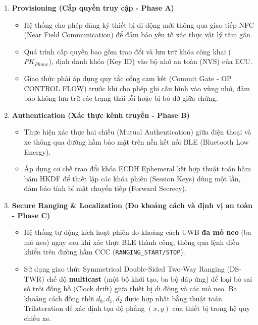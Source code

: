 \begin{enumerate}
    \item \textbf{Provisioning (Cấp quyền truy cập - Phase A)}
    \begin{itemize}
        \item Hệ thống cho phép đăng ký thiết bị di động mới thông qua giao tiếp NFC (Near Field Communication) để đảm bảo yếu tố xác thực vật lý tầm gần.
        \item Quá trình cấp quyền bao gồm trao đổi và lưu trữ khóa công khai ($PK_{Phone}$), định danh khóa (Key ID) vào bộ nhớ an toàn (NVS) của ECU.
        \item Giao thức phải áp dụng quy tắc cổng cam kết (Commit Gate - OP CONTROL FLOW) trước khi cho phép ghi cấu hình vào vùng nhớ, đảm bảo không lưu trữ các trạng thái lỗi hoặc bị bỏ dở giữa chừng.
    \end{itemize}

    \item \textbf{Authentication (Xác thực kênh truyền - Phase B)}
    \begin{itemize}
        \item Thực hiện xác thực hai chiều (Mutual Authentication) giữa điện thoại và xe thông qua đường hầm bảo mật trên nền kết nối BLE (Bluetooth Low Energy).
        \item Áp dụng cơ chế trao đổi khóa ECDH Ephemeral kết hợp thuật toán hàm băm HKDF để thiết lập các khóa phiên (Session Keys) dùng một lần, đảm bảo tính bí mật chuyển tiếp (Forward Secrecy).
    \end{itemize}

    \item \textbf{Secure Ranging \& Localization (Đo khoảng cách và định vị an toàn - Phase C)}
    \begin{itemize}
        \item Hệ thống tự động kích hoạt phiên đo khoảng cách UWB \textbf{đa mỏ neo} (ba mỏ neo) ngay sau khi xác thực BLE thành công, thông qua lệnh điều khiển trên đường hầm CCC (\texttt{RANGING\_START/STOP}).
        \item Sử dụng giao thức Symmetrical Double-Sided Two-Way Ranging (DS-TWR) chế độ \textbf{multicast} (một bộ khởi tạo, ba bộ đáp ứng) để loại bỏ sai số trôi đồng hồ (Clock drift) giữa thiết bị di động và các mỏ neo. Ba khoảng cách đồng thời $d_0, d_1, d_2$ được hợp nhất bằng thuật toán Trilateration để xác định tọa độ phẳng $(x, y)$ của thiết bị trong hệ quy chiếu xe.
    \end{itemize}


\end{enumerate}
